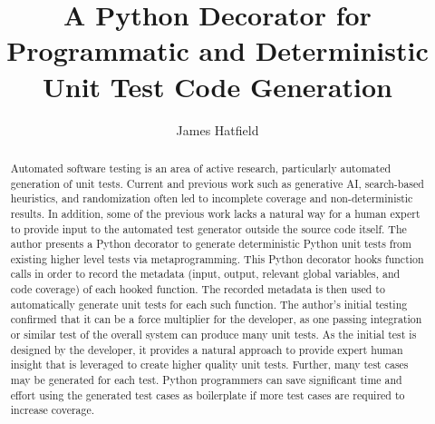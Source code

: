 \documentclass[%
  anonymous=true,%
  authordraft=false,%
  format=sigconf,%
  review=false,%
  screen=true,%
  timestamp=false,%
  pbalance,%
]{acmart}
\begin{document}

\title{A Python Decorator for Programmatic and Deterministic Unit Test Code Generation}

\author{James Hatfield}


  

\begin{abstract}
  Automated software testing is an area of active research, 
  particularly automated generation of unit tests. 
  Current and previous work such as generative AI, search-based heuristics, and 
  randomization often led to incomplete coverage and non-deterministic results.
  In addition, some of the previous work lacks a natural way for a human expert 
  to provide input to the automated test generator outside the source code itself. 
  The author presents a Python decorator to generate deterministic Python 
  unit tests from existing higher level tests via metaprogramming.  
  This Python decorator hooks function calls in order to record the 
  metadata (input, output, relevant global variables, and code coverage) 
  of each hooked function. 
  The recorded metadata is then used to automatically generate unit 
  tests for each such function.
  The author's initial testing confirmed that it can 
  be a force multiplier for the developer, 
  as one passing integration or similar test of the overall 
  system can produce many unit tests.  
  As the initial test is designed by the developer, it provides a natural 
  approach to provide expert human insight that is leveraged to create 
  higher quality unit tests.
  Further, many test cases may be generated for each test.  
  Python programmers can save significant time and effort using the 
  generated test cases as boilerplate if more test cases are required to 
  increase coverage.  

\end{abstract}
\end{document}
